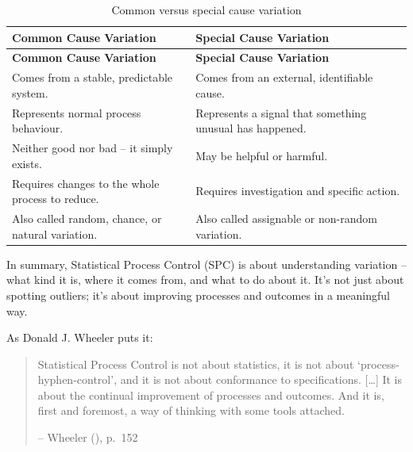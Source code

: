 \documentclass[
]{book}
\begin{document}
\begin{longtable}[]{@{}
  >{\raggedright\arraybackslash}p{}
  >{\raggedright\arraybackslash}p{}@{}}
\caption{Common versus special cause variation}\tabularnewline
\toprule\noalign{}
\begin{minipage}[b]{\linewidth}\raggedright
\textbf{Common Cause Variation}
\end{minipage} & \begin{minipage}[b]{\linewidth}\raggedright
\textbf{Special Cause Variation}
\end{minipage} \\
\midrule\noalign{}
\endfirsthead
\toprule\noalign{}
\begin{minipage}[b]{\linewidth}\raggedright
\textbf{Common Cause Variation}
\end{minipage} & \begin{minipage}[b]{\linewidth}\raggedright
\textbf{Special Cause Variation}
\end{minipage} \\
\midrule\noalign{}
\endhead
\bottomrule\noalign{}
\endlastfoot
Comes from a stable, predictable system. & Comes from an external,
identifiable cause. \\
Represents normal process behaviour. & Represents a signal that
something unusual has happened. \\
Neither good nor bad -- it simply exists. & May be helpful or
harmful. \\
Requires changes to the whole process to reduce. & Requires
investigation and specific action. \\
Also called random, chance, or natural variation. & Also called
assignable or non-random variation. \\
\end{longtable}

In summary, Statistical Process Control (SPC) is about understanding
variation -- what kind it is, where it comes from, and what to do about
it. It's not just about spotting outliers; it's about improving
processes and outcomes in a meaningful way.

As Donald J. Wheeler puts it:

\begin{quote}
Statistical Process Control is not about statistics, it is not about
`process-hyphen-control', and it is not about conformance to
specifications. {[}\ldots{]} It is about the continual improvement of
processes and outcomes. And it is, first and foremost, a way of thinking
with some tools attached.

-- Wheeler (), p.~152
\end{quote}
\end{document}
